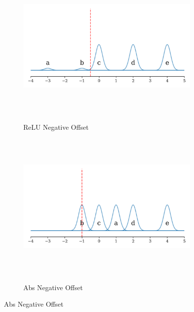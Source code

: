 \begin{figure}[ht]
    \centering

    \begin{subfigure}[b]{0.49\textwidth}
        \centering
        \includegraphics[width=\textwidth]{images/offset_relu_neg}
        \caption{ReLU Negative Offset}
        \label{fig:relu_offset_down}
    \end{subfigure}
    \hfill
    \begin{subfigure}[b]{0.49\textwidth}
        \centering
        \includegraphics[width=\textwidth]{images/offset_abs_neg}
        \caption{Abs Negative Offset}
        \label{fig:abs_offset_down}
    \end{subfigure}


\end{figure}
